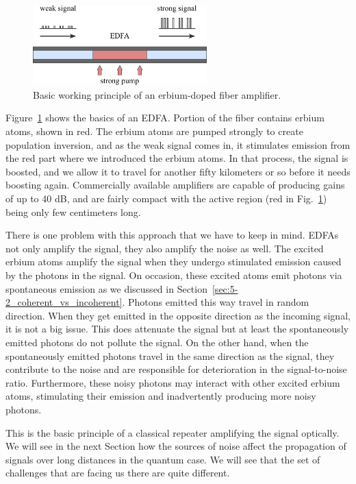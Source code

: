 \begin{figure}[t]
    \centering
    \includegraphics[width=0.6\textwidth]{lesson11/11-4_edfa.pdf}
    \caption[EDFA]{Basic working principle of an erbium-doped fiber amplifier.}
    \label{fig:11-4_edfa}
\end{figure}

Figure~\ref{fig:11-4_edfa} shows the basics of an EDFA.
Portion of the fiber contains erbium atoms, shown in red. The erbium atoms are pumped strongly to create population inversion, and as the weak signal comes in, it stimulates emission from the red part where we introduced the erbium atoms. In that process, the signal is boosted, and we allow it to travel for another fifty kilometers or so before it needs boosting again.
Commercially available amplifiers are capable of producing gains of up to 40 dB, and are fairly compact with the active region (red in Fig.~\ref{fig:11-4_edfa}) being only few centimeters long.

There is one problem with this approach that we have to keep in mind.
EDFAs not only amplify the signal, they also amplify the noise as well.
The excited erbium atoms amplify the signal when they undergo stimulated emission caused by the photons in the signal.
On occasion, these excited atoms emit photons via spontaneous emission as we discussed in Section~\ref{sec:5-2_coherent_vs_incoherent}.
Photons emitted this way travel in random direction.
When they get emitted in the opposite direction as the incoming signal, it is not a big issue. This does attenuate the signal but at least the spontaneously emitted photons do not pollute the signal.
On the other hand, when the spontaneously emitted photons travel in the same direction as the signal, they contribute to the noise and are responsible for deterioration in the signal-to-noise ratio.
Furthermore, these noisy photons may interact with other excited erbium atoms, stimulating their emission and inadvertently producing more noisy photons.

This is the basic principle of a classical repeater amplifying the signal optically. We will see in the next Section how the sources of noise affect the propagation of signals over long distances in the quantum case.
We will see that the set of challenges that are facing us there are quite different.



